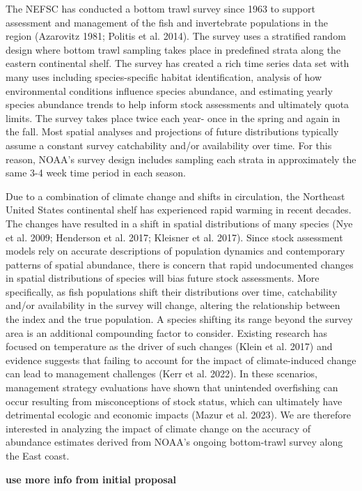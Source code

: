 \documentclass[
  12pt,
]{article}
\begin{document}
The NEFSC has conducted a bottom trawl survey since 1963 to support assessment and management of the fish and invertebrate populations in the region (Azarovitz 1981; Politis et al. 2014). The survey uses a stratified random design where bottom trawl sampling takes place in predefined strata along the eastern continental shelf. The survey has created a rich time series data set with many uses including species-specific habitat identification, analysis of how environmental conditions influence species abundance, and estimating yearly species abundance trends to help inform stock assessments and ultimately quota limits. The survey takes place twice each year- once in the spring and again in the fall. Most spatial analyses and projections of future distributions typically assume a constant survey catchability and/or availability over time. For this reason, NOAA's survey design includes sampling each strata in approximately the same 3-4 week time period in each season.

Due to a combination of climate change and shifts in circulation, the Northeast United States continental shelf has experienced rapid warming in recent decades. The changes have resulted in a shift in spatial distributions of many species (Nye et al. 2009; Henderson et al. 2017; Kleisner et al. 2017). Since stock assessment models rely on accurate descriptions of population dynamics and contemporary patterns of spatial abundance, there is concern that rapid undocumented changes in spatial distributions of species will bias future stock assessments. More specifically, as fish populations shift their distributions over time, catchability and/or availability in the survey will change, altering the relationship between the index and the true population. A species shifting its range beyond the survey area is an additional compounding factor to consider. Existing research has focused on temperature as the driver of such changes (Klein et al. 2017) and evidence suggests that failing to account for the impact of climate-induced change can lead to management challenges (Kerr et al. 2022). In these scenarios, management strategy evaluations have shown that unintended overfishing can occur resulting from misconceptions of stock status, which can ultimately have detrimental ecologic and economic impacts (Mazur et al. 2023). We are therefore interested in analyzing the impact of climate change on the accuracy of abundance estimates derived from NOAA's ongoing bottom-trawl survey along the East coast.

\textbf{use more info from initial proposal}
\end{document}
